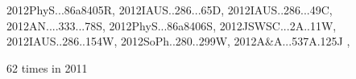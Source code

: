 \documentclass[12pt]{article}
\begin{document}
\begin{description}
{2012PhyS...86a8405R,%
2012IAUS..286...65D,%
2012IAUS..286...49C,%
2012AN....333...78S,%
2012PhyS...86a8406S,%
2012JSWSC...2A..11W,%
2012IAUS..286..154W,%
2012SoPh..280..299W,%
2012A&A...537A.125J%
},\item
62 times in 2011 \citep{
2011A&A...530L...7G,%
2011A&A...528A...6G,%
2011sf2a.conf..215G,%
2011MNRAS.418.1356R,%
2011AN....332..883K,%
2011A&A...531A.162K,%
2011ApJ...742...34K,%
2011AN....332..876M,%
2011PhRvE..84e6314R,%
2011ESS.....2.3302L,%
2011IAUS..274...50J,%
2011IAUS..276...89J,%
2011PhRvE..84d6321R,%
2011arXiv1110.1163T,%
2011ApJ...740...18O,%
2011A&A...534A.122R,%
}
\end{description}
\end{document}
